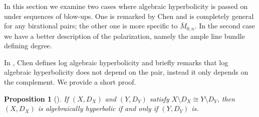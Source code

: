 \documentclass{amsart}
\newtheorem{proposition}[theorem]{Proposition}
\theoremstyle{definition}
\theoremstyle{remark}
\begin{document}
In this section we examine two cases  where algebraic hyperbolicity is passed on under sequences of blow-ups. One is remarked by Chen \cite{chen2001algebraichyperbolicitylogsurfaces} and is completely general for any birational pairs; the other one is more specific to $\overline{M}_{0,n}$. In the second case we have a better description of the polarization, namely the ample line bundle defining degree.

In \cite{chen2001algebraichyperbolicitylogsurfaces}, Chen defines log algebraic hyperbolicity and briefly remarks that log algebraic hyperbolicity does not depend on the pair, instead it only depends on the complement. We provide a short proof.

\begin{proposition}[{\cite[p.~4]{chen2001algebraichyperbolicitylogsurfaces}}]
If $(X, D_X)$ and $(Y, D_Y)$ satisfy $X \setminus D_X \cong Y \setminus D_Y$, then $(X, D_X)$ is algebraically hyperbolic if and only if $(Y, D_Y)$ is.
\end{proposition}
\end{document}
